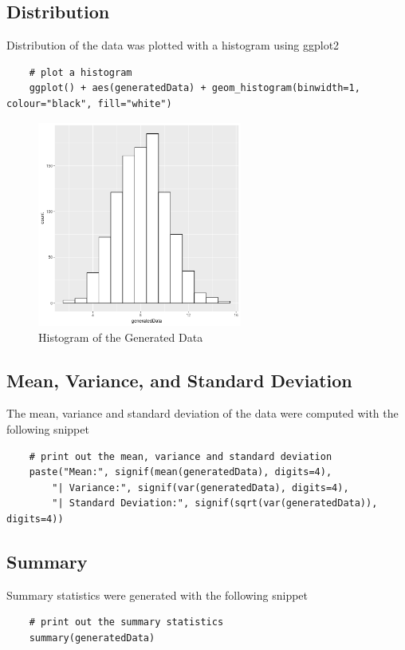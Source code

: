 \documentclass{article}
\begin{document}
        \subsection{Distribution}
            Distribution of the data was plotted with a histogram using ggplot2
\begin{lstlisting}
    # plot a histogram
    ggplot() + aes(generatedData) + geom_histogram(binwidth=1, colour="black", fill="white")
\end{lstlisting}

            \begin{figure}[h]
                \begin{center}
                    \includegraphics[width=0.6\textwidth]{hist} %
                    \caption{Histogram of the Generated Data}
                \end{center}
            \end{figure}

        \subsection{Mean, Variance, and Standard Deviation}
            The mean, variance and standard deviation of the data were computed with the following snippet
\begin{lstlisting}
    # print out the mean, variance and standard deviation
    paste("Mean:", signif(mean(generatedData), digits=4),
        "| Variance:", signif(var(generatedData), digits=4),
        "| Standard Deviation:", signif(sqrt(var(generatedData)), digits=4))
\end{lstlisting}

        \subsection{Summary}
            Summary statistics were generated with the following snippet
\begin{lstlisting}
    # print out the summary statistics
    summary(generatedData)
\end{lstlisting}
\end{document}
